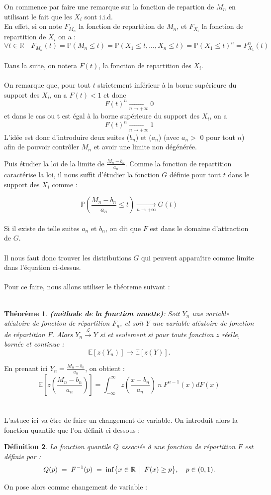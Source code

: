 \documentclass{article}
\theoremstyle{plain}
\newtheorem{definition}{Définition}[section]
\theoremstyle{definition}
\theoremstyle{plain}
\newtheorem{theorem}[definition]{Théorème}
\begin{document}
On commence par faire une remarque sur la fonction de repartion de $M_n$ en utilisant le fait que les $X_i$ sont i.i.d.
\\
En effet, si on note $F_{M_n}$ la fonction de repartition de $M_n$, et $F_{X_i}$ la fonction de repartition de $X_i$ on a :
\[
\forall t \in \mathbb{R} \quad F_{M_n}(t) = \mathbb{P}(M_n \le t) = \mathbb{P}(X_1 \le t,...,X_n \le t)=\mathbb{P}(X_1 \le t)^n = F_{X_1}^n(t) 
\]
\\
Dans la suite, on notera $F(t)$, la fonction de repartition des $X_i$.
\\
\\
On remarque que, pour tout $t$ strictement inférieur à la borne supérieure du support des $X_i$, on a $F(t)<1$ et donc
\[
F(t)^n \xrightarrow[n\to +\infty]{} 0
\]
et dans le cas ou t est égal à la borne supérieure du support des $X_i$, on a
\[
F(t)^n \xrightarrow[n\to +\infty]{} 1
\]
L'idée est donc d'introduire deux suites ($b_n$) et ($a_n$) (avec $a_n > $  0 pour tout $n$) afin de pouvoir contrôler $M_n$ et avoir une limite non dégénérée.

Puis étudier la loi de la limite de $\frac{M_n - b_n}{a_n}$. Comme la fonction de repartition caractérise la loi, il nous suffit d'étudier la fonction $G$ définie pour tout $t$ dans le support des $X_i$ comme :

\[
\mathbb{P} \left( \frac{M_n - b_n}{a_n} \le t \right) \xrightarrow[n\to +\infty]{} G(t)
\]
\\
Si il existe de telle suites $a_n$ et $b_n$, on dit que $F$ est dans le domaine d'attraction de $G$.
\\
\\
Il nous faut donc trouver les distributions $G$ qui peuvent apparaître comme limite dans l’équation ci-dessus.
\\
\\
Pour ce faire, nous allons utiliser le théoreme suivant : 
\\
\\
\begin{theorem}
\textbf{(méthode de la fonction muette)}:
Soit \( Y_n \) une variable aléatoire de fonction de répartition \( F_n \), et soit \( Y \) une variable aléatoire de fonction de répartition \( F \).  
Alors $Y_n \xrightarrow{\mathcal{L} } Y$ si et seulement si pour toute fonction $z$ réelle, bornée et continue :
\[
\mathbb{E}[z(Y_n)] \to \mathbb{E}[z(Y)].
\]
\end{theorem}
\noindent En prenant ici $Y_n = \frac{M_n -b_n}{a_n}$, on obtient :
\[
\mathbb{E}[z(\frac{M_n -b_n}{a_n})] = \int_{-\infty}^{\infty} z(\frac{x-b_n}{a_n}) \: n \:  F^{n-1} (x)dF(x)
\]
\\
\\
L'astuce ici va être de faire un changement de variable. On introduit alors la fonction quantile que l'on définit ci-dessous :
\begin{definition}
La fonction quantile \(Q\) associée à une fonction de répartition \(F\) est définie par :
\[
Q(p) \;=\; F^{-1}(p)
\;=\;
\inf\bigl\{x\in\mathbb{R}\,\bigm|\,F(x)\ge p\bigr\},
\quad p\in(0,1).
\]
\end{definition}
\medskip 
\noindent On pose alors comme changement de variable : 
\end{document}
